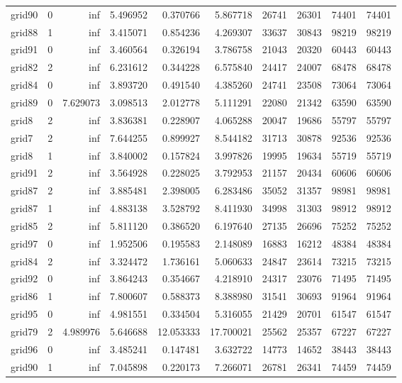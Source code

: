 \begin{longtable}{|l|r|r|r|r|r|r|r|r|r|}
grid90 & 0 & inf & 5.496952 & 0.370766 & 5.867718 & 26741 & 26301 & 74401 & 74401 \\
grid88 & 1 & inf & 3.415071 & 0.854236 & 4.269307 & 33637 & 30843 & 98219 & 98219 \\
grid91 & 0 & inf & 3.460564 & 0.326194 & 3.786758 & 21043 & 20320 & 60443 & 60443 \\
grid82 & 2 & inf & 6.231612 & 0.344228 & 6.575840 & 24417 & 24007 & 68478 & 68478 \\
grid84 & 0 & inf & 3.893720 & 0.491540 & 4.385260 & 24741 & 23508 & 73064 & 73064 \\
grid89 & 0 & 7.629073 & 3.098513 & 2.012778 & 5.111291 & 22080 & 21342 & 63590 & 63590 \\
grid8 & 2 & inf & 3.836381 & 0.228907 & 4.065288 & 20047 & 19686 & 55797 & 55797 \\
grid7 & 2 & inf & 7.644255 & 0.899927 & 8.544182 & 31713 & 30878 & 92536 & 92536 \\
grid8 & 1 & inf & 3.840002 & 0.157824 & 3.997826 & 19995 & 19634 & 55719 & 55719 \\
grid91 & 2 & inf & 3.564928 & 0.228025 & 3.792953 & 21157 & 20434 & 60606 & 60606 \\
grid87 & 2 & inf & 3.885481 & 2.398005 & 6.283486 & 35052 & 31357 & 98981 & 98981 \\
grid87 & 1 & inf & 4.883138 & 3.528792 & 8.411930 & 34998 & 31303 & 98912 & 98912 \\
grid85 & 2 & inf & 5.811120 & 0.386520 & 6.197640 & 27135 & 26696 & 75252 & 75252 \\
grid97 & 0 & inf & 1.952506 & 0.195583 & 2.148089 & 16883 & 16212 & 48384 & 48384 \\
grid84 & 2 & inf & 3.324472 & 1.736161 & 5.060633 & 24847 & 23614 & 73215 & 73215 \\
grid92 & 0 & inf & 3.864243 & 0.354667 & 4.218910 & 24317 & 23076 & 71495 & 71495 \\
grid86 & 1 & inf & 7.800607 & 0.588373 & 8.388980 & 31541 & 30693 & 91964 & 91964 \\
grid95 & 0 & inf & 4.981551 & 0.334504 & 5.316055 & 21429 & 20701 & 61547 & 61547 \\
grid79 & 2 & 4.989976 & 5.646688 & 12.053333 & 17.700021 & 25562 & 25357 & 67227 & 67227 \\
grid96 & 0 & inf & 3.485241 & 0.147481 & 3.632722 & 14773 & 14652 & 38443 & 38443 \\
grid90 & 1 & inf & 7.045898 & 0.220173 & 7.266071 & 26781 & 26341 & 74459 & 74459 \\

\end{longtable}
